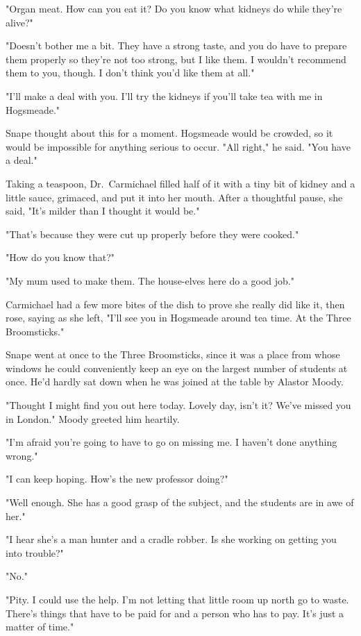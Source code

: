 "Organ meat. How can you eat it? Do you know what kidneys do while they're alive?"

"Doesn't bother me a bit. They have a strong taste, and you do have to prepare them properly so they're not too strong, but I like them. I wouldn't recommend them to you, though. I don't think you'd like them at all."

"I'll make a deal with you. I'll try the kidneys if you'll take tea with me in Hogsmeade."

Snape thought about this for a moment. Hogsmeade would be crowded, so it would be impossible for anything serious to occur. "All right," he said. "You have a deal."

Taking a teaspoon, Dr.~Carmichael filled half of it with a tiny bit of kidney and a little sauce, grimaced, and put it into her mouth. After a thoughtful pause, she said, "It's milder than I thought it would be."

"That's because they were cut up properly before they were cooked."

"How do you know that?"

"My mum used to make them. The house-elves here do a good job."

Carmichael had a few more bites of the dish to prove she really did like it, then rose, saying as she left, "I'll see you in Hogsmeade around tea time. At the Three Broomsticks."

Snape went at once to the Three Broomsticks, since it was a place from whose windows he could conveniently keep an eye on the largest number of students at once. He'd hardly sat down when he was joined at the table by Alastor Moody.

"Thought I might find you out here today. Lovely day, isn't it? We've missed you in London." Moody greeted him heartily.

"I'm afraid you're going to have to go on missing me. I haven't done anything wrong."

"I can keep hoping. How's the new professor doing?"

"Well enough. She has a good grasp of the subject, and the students are in awe of her."

"I hear she's a man hunter and a cradle robber. Is she working on getting you into trouble?"

"No."

"Pity. I could use the help. I'm not letting that little room up north go to waste. There's things that have to be paid for and a person who has to pay. It's just a matter of time."

